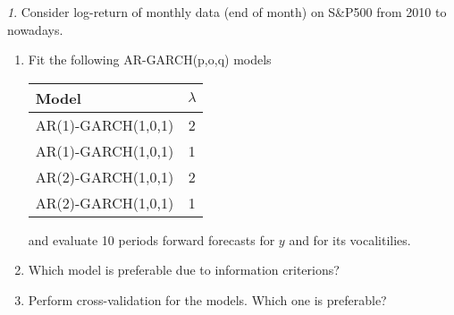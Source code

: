 \documentclass[12pt]{article}
\theoremstyle{remark}
\newtheorem{exercise}{}[section]
\begin{document}
\begin{exercise}
Consider log-return of monthly data (end of month) on S\&P500 from 2010 to nowadays.
\begin{enumerate}
	\item Fit the following AR-GARCH(p,o,q) models
	\begin{center}
	\begin{tabular}{l|c}
		Model & \(\lambda\) \\ \hline
		AR(1)-GARCH(1,0,1) & 2 \\
		AR(1)-GARCH(1,0,1) & 1 \\
		AR(2)-GARCH(1,0,1) & 2 \\
		AR(2)-GARCH(1,0,1) & 1 \\ \hline
	\end{tabular}
	\end{center} 
	and evaluate 10 periods forward forecasts for \(y\) and for its vocalitilies.
	\item Which model is preferable due to information criterions?
	\item Perform cross-validation for the models. Which one is preferable?
\end{enumerate}
\end{exercise}
	
\end{document}
